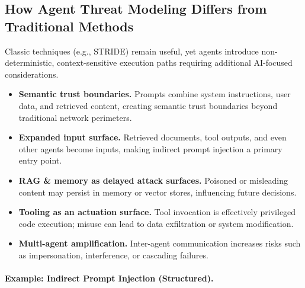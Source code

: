 \begin{TNtwocol}
      \subsection{How Agent Threat Modeling Differs from Traditional Methods}

      Classic techniques (e.g., STRIDE) remain useful, yet agents introduce non-deterministic, context-sensitive execution paths requiring additional AI-focused considerations.\cite{NIST_AI_RMF_100_1,NIST_GenAI_Profile_600_1}

      \begin{itemize}
            \item \textbf{Semantic trust boundaries.}
                  Prompts combine system instructions, user data, and retrieved content, creating semantic trust boundaries beyond traditional network perimeters.\cite{OWASP_LLM_Top10,OWASP_Prompt_Injection_CS}

            \item \textbf{Expanded input surface.}
                  Retrieved documents, tool outputs, and even other agents become inputs, making indirect prompt injection a primary entry point.\cite{OWASP_Prompt_Injection_CS}

            \item \textbf{RAG \& memory as delayed attack surfaces.}
                  Poisoned or misleading content may persist in memory or vector stores, influencing future decisions.\cite{NIST_GenAI_Profile_600_1}

            \item \textbf{Tooling as an actuation surface.}
                  Tool invocation is effectively privileged code execution; misuse can lead to data exfiltration or system modification.\cite{MITRE_ATLAS}

            \item \textbf{Multi-agent amplification.}
                  Inter-agent communication increases risks such as impersonation, interference, or cascading failures.\cite{MITRE_ATLAS}
      \end{itemize}

      \paragraph{Example: Indirect Prompt Injection (Structured).}


\end{TNtwocol}
